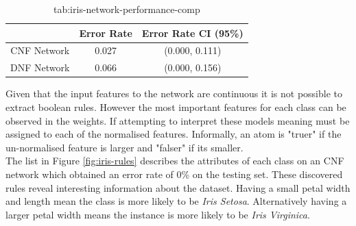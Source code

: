 \begin{table}[H]
	\begin{center}
		\begin{tabular}{| c | c | c |}
			\hline
			& Error Rate & Error Rate CI (95\%) \\
			\hline
			\hline
			CNF Network & 0.027 & (0.000, 0.111) \\
			\hline
			DNF Network & 0.066 & (0.000, 0.156) \\
			\hline
		\end{tabular}
	\end{center}
	\caption{tab:iris-network-performance-comp}
	\label{tab:iris-network-peformance-comp}
\end{table}

Given that the input features to the network are continuous it is not possible to extract boolean rules. However the most important features for each class can be observed in the weights. If attempting to interpret these models meaning must be assigned to each of the normalised features. Informally, an atom is "truer" if the un-normalised feature is larger and "falser" if its smaller.\\

The list in Figure \ref{fig:iris-rules} describes the attributes of each class on an CNF network which obtained an error rate of 0\% on the testing set. These discovered rules reveal interesting information about the dataset. Having a small petal width and length mean the class is more likely to be \textit{Iris Setosa}. Alternatively having a larger petal width means the instance is more likely to be \textit{Iris Virginica}.

